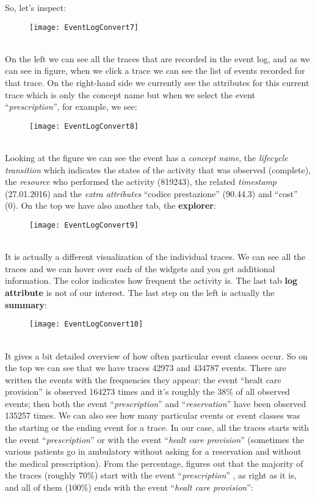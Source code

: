 \documentclass[paper=a4, fontsize=11pt]{scrartcl} %
\numberwithin{equation}{section} %
\numberwithin{figure}{section} %
\numberwithin{table}{section} %
\begin{document}
\newpage
So, let's inspect:
\begin{figure} [htbp]
\centering
\texttt{[image: EventLogConvert7]}
\end{figure}\\
On the left we can see all the traces that are recorded in the event log, and as we can see in figure, when we click a trace we can see the list of events recorded for that trace. On the right-hand side we currently see the attributes for this current trace which is only the concept name but when we select the event ``\textit{prescription}'', for example, we see: 
\begin{figure} [htbp]
\centering
\texttt{[image: EventLogConvert8]}
\end{figure}\\
Looking at the figure we can see the event has a \textit{concept name}, the \textit{lifecycle transition} which indicates the states of the activity that was observed (complete), the \textit{resource} who performed the activity (819243), the related \textit{timestamp} (27.01.2016) and the \textit{extra attributes} ``codice prestazione'' (90.44.3) and ``cost'' (0). On the top we have also another tab, the \textbf{explorer}:
\begin{figure} [htbp]
\centering
\texttt{[image: EventLogConvert9]}
\end{figure}\\
It is actually a different visualization of the individual traces. We can see all the traces and we can hover over each of the widgets and you get additional information. The color indicates how frequent the activity is. The last tab \textbf{log attribute} is not of our interest. The last step on the left is actually the \textbf{summary}:
\begin{figure} [htbp]
\centering
\texttt{[image: EventLogConvert10]}
\end{figure}\\
It gives a bit detailed overview of how often particular event classes occur. So on the top we can see that we have  traces 42973 and 434787 events. There are written the events with the frequencies they appear: the event ``healt care provision'' is observed 164273 times and it's roughly the 38\% of all observed events; then both the event ``\textit{prescription}'' and ``\textit{reservation}'' have been observed 135257 times. We can also see how many particular events or event classes was the starting or the ending event for a trace. In our case, all the traces starts with the event ``\textit{prescription}'' or with the event ``\textit{healt care provision}'' (sometimes the various patients go in ambulatory without asking for a reservation and without the medical prescription). From the percentage, figures out that the majority of the traces (roughly 70\%) start with the event ``\textit{prescription}'' , as right as it is, and all of them (100\%) ends with the event ``\textit{healt care provision}'':
\end{document}
